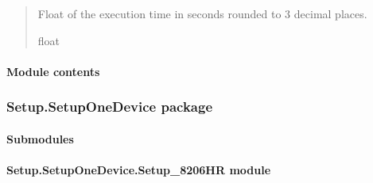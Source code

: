 \documentclass[letterpaper,10pt,english]{sphinxmanual}
\begin{document}
\begin{fulllineitems}
\begin{fulllineitems}
\begin{quote}
\begin{description}
\sphinxAtStartPar
Float of the execution time in seconds rounded to 3 decimal places.

\sphinxAtStartPar
float

\end{description}\end{quote}

\end{fulllineitems}


\end{fulllineitems}



\paragraph{Module contents}
\label{\detokenize{Setup.SetupAllDevices:module-Setup.SetupAllDevices}}\label{\detokenize{Setup.SetupAllDevices:module-contents}}
\sphinxstepscope


\subsubsection{Setup.SetupOneDevice package}
\label{\detokenize{Setup.SetupOneDevice:setup-setuponedevice-package}}\label{\detokenize{Setup.SetupOneDevice::doc}}

\paragraph{Submodules}
\label{\detokenize{Setup.SetupOneDevice:submodules}}

\paragraph{Setup.SetupOneDevice.Setup\_8206HR module}
\label{\detokenize{Setup.SetupOneDevice:module-Setup.SetupOneDevice.Setup_8206HR}}\label{\detokenize{Setup.SetupOneDevice:setup-setuponedevice-setup-8206hr-module}}
\end{document}
